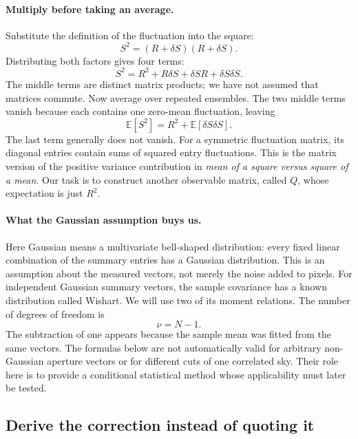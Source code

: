 \documentclass[11pt]{article}
\newcommand{\E}{\mathbb{E}}
\begin{document}
\paragraph{Multiply before taking an average.}
Substitute the definition of the fluctuation into the square:
\begin{equation}
 S^2=(R+\delta S)(R+\delta S).
\end{equation}
Distributing both factors gives four terms:
\begin{equation}
 S^2=R^2+R\delta S+\delta S R+\delta S\delta S.
\end{equation}
The middle terms are distinct matrix products; we have not assumed that
matrices commute. Now average over repeated ensembles. The two middle
terms vanish because each contains one zero-mean fluctuation, leaving
\begin{equation}
 \E[S^2]=R^2+\E[\delta S\delta S].
\end{equation}
The last term generally does not vanish. For a symmetric fluctuation
matrix, its diagonal entries contain sums of squared entry fluctuations.
This is the matrix version of the positive variance contribution in
\emph{mean of a square versus square of a mean}. Our task is to construct
another observable matrix, called $Q$, whose expectation is just $R^2$.

\paragraph{What the Gaussian assumption buys us.}
Here Gaussian means a multivariate bell-shaped distribution: every fixed
linear combination of the summary entries has a Gaussian distribution.
This is an assumption about the measured vectors, not merely the noise
added to pixels. For independent Gaussian summary vectors, the sample
covariance has a known distribution called Wishart. We will use two of its moment
relations. The number of degrees of freedom is
\begin{equation}
 \nu=N-1.
\end{equation}
The subtraction of one appears because the sample mean was fitted from
the same vectors. The formulas below are not automatically valid for
arbitrary non-Gaussian aperture vectors or for different cuts of one
correlated sky. Their role here is to provide a conditional statistical
method whose applicability must later be tested.

\subsection{Derive the correction instead of quoting it}
\end{document}
